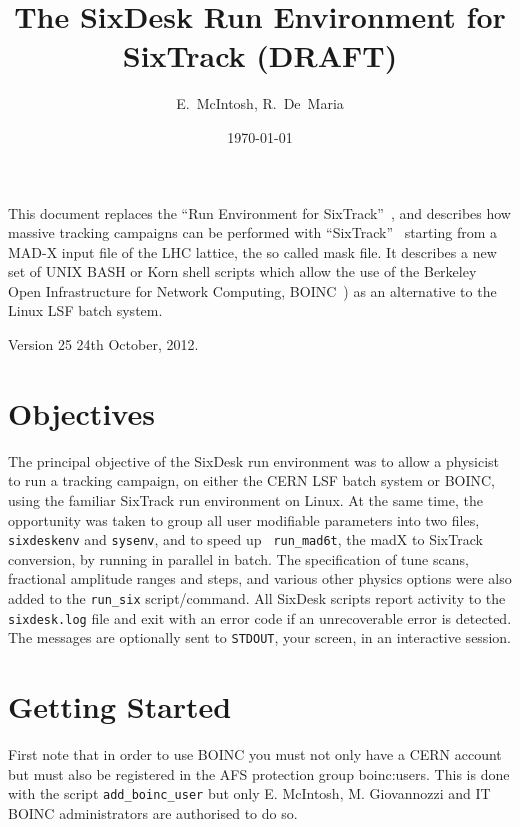 \documentclass{article}    %
\begin{document}
\begin{titlepage}
\date{\today}
\title{The SixDesk Run Environment for SixTrack (DRAFT)}
\author{E.~McIntosh, R.~De~Maria}

\maketitle

  This document replaces the ``Run Environment for 
  SixTrack''~\cite{Runsix},
  and describes how massive tracking campaigns can be
  performed with ``SixTrack''~\cite{SixTrack} starting from a MAD-X input
  file of the LHC lattice, the so called mask file. It describes a new set 
  of UNIX BASH or Korn shell scripts which allow the use of 
  the Berkeley Open Infrastructure for
 Network Computing, BOINC~\cite{Boinc}) as an alternative to the Linux LSF batch system.

\end{titlepage}
%
Version 25 24th October, 2012.

\section{Objectives}
%
The principal objective of the SixDesk run environment was to allow a
physicist to run a tracking campaign, on either the CERN LSF batch system or
BOINC, using the familiar SixTrack run environment on Linux.  At the same
time, the opportunity was taken to group all user modifiable parameters into
two files, {\tt sixdeskenv} and {\tt sysenv}, and to speed up {\tt
run\_mad6t}, the madX to SixTrack conversion, by running in parallel in batch.
The specification of tune scans, fractional amplitude ranges and steps, and
various other physics options were also added to the {\tt run\_six}
script/command.  All SixDesk scripts report activity to the {\tt sixdesk.log}
file and exit with an error code if an unrecoverable error is detected.  The
messages are optionally sent to {\tt STDOUT}, your screen, in an interactive
session.
%
\section{Getting Started} First note that in order to use BOINC you must not
only have a CERN account but must also be registered in the AFS protection
group boinc:users. This is done with the script {\tt add\_boinc\_user} but
only E. McIntosh, M. Giovannozzi and IT BOINC administrators are authorised to
do so.
\end{document}

